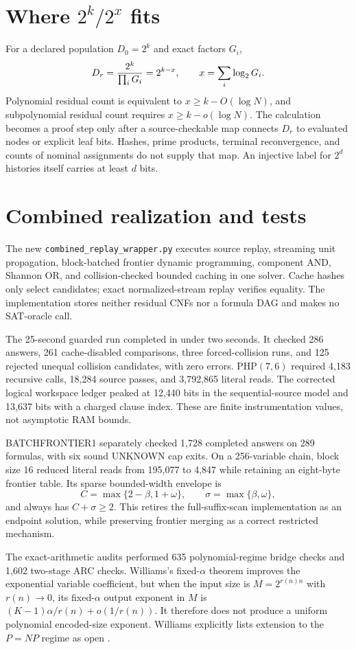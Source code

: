 \documentclass[11pt]{article}
\begin{document}
\section{Where $2^k/2^x$ fits}
For a declared population $D_0=2^k$ and exact factors $G_i$,
\[
 D_r={2^k\over\prod_iG_i}=2^{k-x},\qquad
 x=\sum_i\log_2G_i.
\]
Polynomial residual count is equivalent to
$x\ge k-O(\log N)$, and subpolynomial residual count requires
$x\ge k-o(\log N)$.  The calculation becomes a proof step only after a
source-checkable map connects $D_r$ to evaluated nodes or explicit leaf
bits.  Hashes, prime products, terminal reconvergence, and counts of nominal
assignments do not supply that map.  An injective label for $2^d$ histories
itself carries at least $d$ bits.

\section{Combined realization and tests}
The new \texttt{combined\_replay\_wrapper.py} executes source replay,
streaming unit propagation, block-batched frontier dynamic programming,
component AND, Shannon OR, and collision-checked bounded caching in one
solver.  Cache hashes only select candidates; exact normalized-stream replay
verifies equality.  The implementation stores neither residual CNFs nor a
formula DAG and makes no SAT-oracle call.

The 25-second guarded run completed in under two seconds.  It checked 286
answers, 261 cache-disabled comparisons, three forced-collision runs, and 125
rejected unequal collision candidates, with zero errors.  PHP$(7,6)$ required
4,183 recursive calls, 18,284 source passes, and 3,792,865 literal reads.
The corrected logical workspace ledger peaked at 12,440 bits in the
sequential-source model and 13,637 bits with a charged clause index.  These
are finite instrumentation values, not asymptotic RAM bounds.

BATCHFRONTIER1 separately checked 1,728 completed answers on 289 formulas,
with six sound UNKNOWN cap exits.  On a 256-variable chain, block size 16
reduced literal reads from 195,077 to 4,847 while retaining an eight-byte
frontier table.  Its sparse bounded-width envelope is
\[
 C=\max\{2-\beta,1+\omega\},\qquad
 \sigma=\max\{\beta,\omega\},
\]
and always has $C+\sigma\ge2$.  This retires the full-suffix-scan
implementation as an endpoint solution, while preserving frontier merging
as a correct restricted mechanism.

The exact-arithmetic audits performed 635 polynomial-regime bridge checks
and 1,602 two-stage ARC checks.  Williams's fixed-$\alpha$ theorem improves
the exponential variable coefficient, but when the input size is
$M=2^{r(n)n}$ with $r(n)\to0$, its fixed-$\alpha$ output exponent in $M$ is
$(K-1)\alpha/r(n)+o(1/r(n))$.  It therefore does not produce a uniform
polynomial encoded-size exponent.  Williams explicitly lists extension to
the $P=NP$ regime as open \cite{williams2024}.
\end{document}
